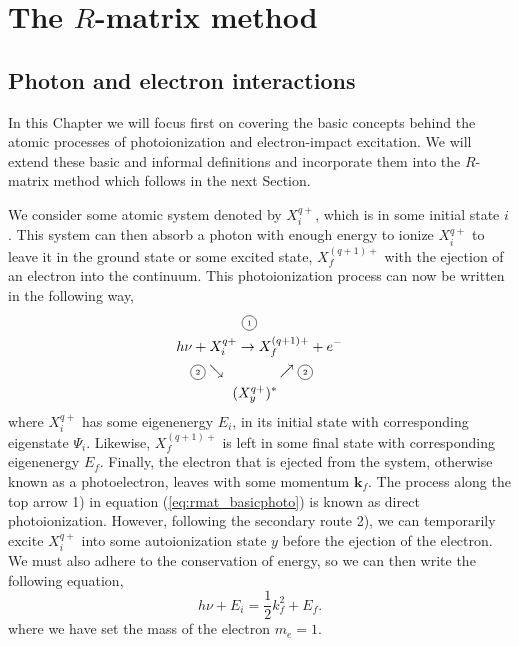 
\chapter{The $R$-matrix method} %

\label{cha:rmatrix} %



\section{Photon and electron interactions}\label{sec:cross}
In this Chapter we will focus first on covering the basic concepts behind the atomic processes of photoionization and electron-impact excitation. We will extend these basic and informal definitions and incorporate them into the $R$-matrix method which follows in the next Section.

We consider some atomic system denoted by $X_i^{q+}$, which is in some initial state $i$. This system can then absorb a photon with enough energy to ionize $X_i^{q+}$ to leave it in the ground state or some excited state, $X_f^{(q+1)+}$ with the ejection of an electron into the continuum. This photoionization process can now be written in the following way,
\begin{equation}\label{eq:rmat_basicphoto}
\begin{split}
& ~~~~~~~~~~~~~~ \tiny{\circled{1}}\\
& h\nu+ X_i^{q+} \rightarrow X_f^{(q+1)+} +e^-\\
& ~~~\tiny{\circled{2}}\searrow ~~~~~~~~~~~~~~~~~\nearrow \tiny{\circled{2}} \\
& ~~~~~~~~~~~~(X_y^{q+})^*
\end{split}
\end{equation}
where $X_i^{q+}$ has some eigenenergy $E_i$, in its initial state with corresponding eigenstate $\Psi_i$. Likewise, $X_f^{(q+1)+}$ is left in some final state with corresponding eigenenergy $E_f$. Finally, the electron that is ejected from the system, otherwise known as a photoelectron, leaves with some momentum $\boldsymbol{k}_f$. The process along the top arrow 1) in equation (\ref{eq:rmat_basicphoto}) is known as direct photoionization. However, following the secondary route 2), we can temporarily excite $X_i^{q+}$ into some autoionization state $y$ before the ejection of the electron. We must also adhere to the conservation of energy, so we can then write the following equation,
\[
h\nu+E_i=\frac{1}{2}k_f^2+E_f.
\]
where we have set the mass of the electron $m_e=1$.

